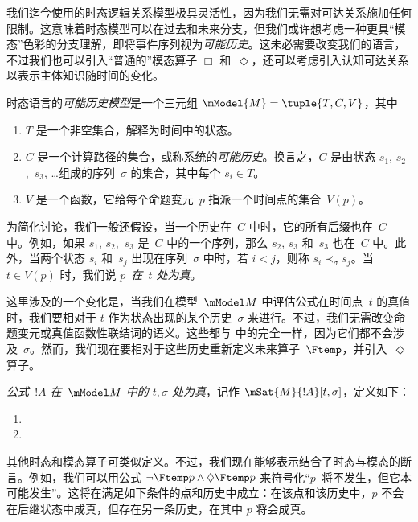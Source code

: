 \documentclass[../../../include/open-logic-section]{subfiles}
\begin{document}


我们迄今使用的时态逻辑关系模型极具灵活性，因为我们无需对可达关系施加任何限制。这意味着时态模型可以在过去和未来分支，但我们或许想考虑一种更具“模态”色彩的分支理解，即将事件序列视为\emph{可能历史}。这未必需要改变我们的语言，不过我们也可以引入“普通的”模态算子 $\Box$ 和~$\Diamond$，还可以考虑引入认知可达关系以表示主体知识随时间的变化。

\begin{defn}
  时态语言的\emph{可能历史模型}是一个三元组 $\mModel{M} = \tuple{T, C, V}$，其中
  \begin{enumerate}
    \item $T$ 是一个非空集合，解释为时间中的状态。
    \item $C$ 是一个计算路径的集合，或称系统的\emph{可能历史}。换言之，$C$ 是由状态 $s_1$, $s_2$,~$s_3$, \dots 组成的序列~$\sigma$ 的集合，其中每个 $s_i \in T$。
    \item $V$ 是一个函数，它给每个命题变元~$p$ 指派一个时间点的集合~$V(p)$。
  \end{enumerate}
  为简化讨论，我们一般还假设，当一个历史在~$C$ 中时，它的所有后缀也在~$C$ 中。例如，如果 $s_1$, $s_2$,~$s_3$ 是~$C$ 中的一个序列，那么 $s_2$, $s_3$ 和~$s_3$ 也在~$C$ 中。此外，当两个状态 $s_i$ 和~$s_j$ 出现在序列~$\sigma$ 中时，若 $i < j$，则称 $s_i \prec_\sigma s_j$。当 $t \in V(p)$ 时，我们说 $p$~\emph{在~$t$ 处为真}。
\end{defn}

这里涉及的一个变化是，当我们在模型~$\mModel M$ 中评估公式在时间点~$t$ 的真值时，我们要相对于 $t$ 作为状态出现的某个历史~$\sigma$ 来进行。不过，我们无需改变命题变元或真值函数性联结词的语义。这些都与  中的完全一样，因为它们都不会涉及~$\sigma$。然而，我们现在要相对于这些历史重新定义未来算子~$\Ftemp$，并引入~$\Diamond$ 算子。

\begin{defn}
  \emph{公式~$!A$ 在~$\mModel M$ 中的 $t, \sigma$ 处为真}，记作 $\mSat{M}{!A}[t, \sigma]$，定义如下：
  \begin{enumerate}
  \item{} 
  \item{} 
  \end{enumerate}
\end{defn}

其他时态和模态算子可类似定义。不过，我们现在能够表示结合了时态与模态的断言。例如，我们可以用公式 $\lnot \Ftemp p \land \Diamond \Ftemp p$ 来符号化“$p$~将不发生，但它本可能发生”。这将在满足如下条件的点和历史中成立：在该点和该历史中，$p$ 不会在后继状态中成真，但存在另一条历史，在其中 $p$ 将会成真。
\end{document}
